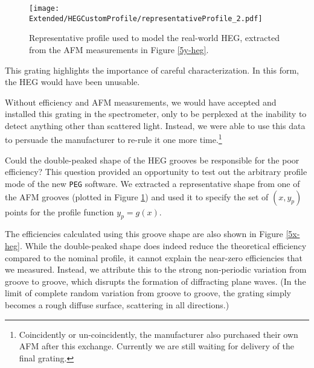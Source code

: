 \begin{figure}[htbp] %
   \centering
   \texttt{[image: Extended/HEGCustomProfile/representativeProfile\_2.pdf]} 
   \caption{Representative profile used to model the real-world HEG, extracted from the AFM measurements in Figure \ref{5y-heg}.}
   \label{hegRepresentativeGroove}
\end{figure}

This grating highlights the importance of careful characterization.  In this form, the HEG would have been unusable.

Without efficiency and AFM measurements, we would have accepted and installed this grating in the spectrometer, only to be perplexed at the inability to detect anything other than scattered light.   Instead, we were able to use this data to persuade the manufacturer to re-rule it one more time.\footnote{Coincidently or un-coincidently, the manufacturer also purchased their own AFM after this exchange.  Currently we are still waiting for delivery of the final grating.}

Could the double-peaked shape of the HEG grooves be responsible for the poor efficiency?  This question provided an opportunity to test out the arbitrary profile mode of the new \texttt{PEG} software.  We extracted a representative shape from one of the AFM grooves (plotted in Figure \ref{hegRepresentativeGroove}) and used it to specify the set of $(x,y_p)$ points for the profile function $y_p = g(x)$.

The efficiencies calculated using this groove shape are also shown in Figure \ref{5x-heg}.  While the double-peaked shape does indeed reduce the theoretical efficiency compared to the nominal profile, it cannot explain the near-zero efficiencies that we measured.  Instead, we attribute this to the strong non-periodic variation from groove to groove, which disrupts the formation of diffracting plane waves.  (In the limit of complete random variation from groove to groove, the grating simply becomes a rough diffuse surface, scattering in all directions.)

